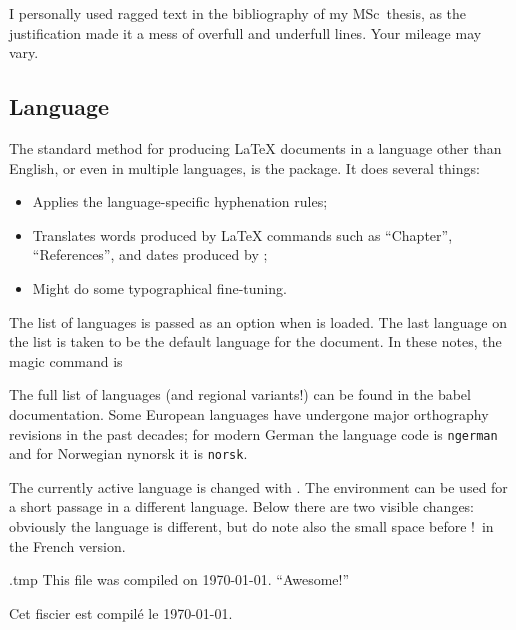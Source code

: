 I personally used ragged text in the bibliography of my MSc~thesis,
as the justification made it a mess of overfull and underfull lines.
Your mileage may vary.



%
%
\subsection{Language}

The standard method for producing \LaTeX{} documents in a language other than English,
or even in multiple languages, is the  package.
It does several things:
\begin{itemize}
    \item Applies the language-specific hyphenation rules;
    \item Translates words produced by \LaTeX{} commands such as ``Chapter'', ``References'',
        and dates produced by ;
    \item Might do some typographical fine-tuning.
\end{itemize}

The list of languages is passed as an option when  is loaded.
The last language on the list is taken to be the default language for the document.
In these notes, the magic command is
%
\begin{ExampleCode}
\usepackage[finnish,french,english]{babel}
\end{ExampleCode}
%
The full list of languages (and regional variants!) can be found in the babel documentation.
Some European languages have undergone major orthography revisions in the past decades;
for modern German the language code is \verb|ngerman|
and for Norwegian nynorsk it is \verb|norsk|.

The currently active language is changed with .
The  environment can be used for a short passage in a different language.
Below there are two visible changes:
obviously the language is different, but do note also the small space before !\ in the French version.
\begin{VerbatimOut}{\jobname.tmp}
This file was compiled on \today.
``Awesome!''\\

\begin{otherlanguage}{french}
Cet fiscier est compilé le \today.
\end{otherlanguage}
\end{VerbatimOut}
\ShowExample

